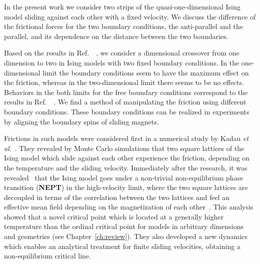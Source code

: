 In the present work we consider two strips of the quasi-one-dimensional Ising model sliding against each other with a fixed velocity. We discuss the difference of the frictional forces for the two boundary conditions, the anti-parallel and the parallel, and its dependence on the distance  between the two boundaries.

Based on the results in Ref.~~\cite{Hucht2009b}, we consider a dimensional crossover from one dimension to two in Ising models with two fixed boundary conditions. In the one-dimensional limit the boundary conditions seem to have the maximum effect on the friction, whereas in the two-dimensional limit there seems to be no effects. Behaviors in the both limits for the free boundary conditions correspond to the results in Ref.~~\cite{Hucht2009b}. We find a method of manipulating the friction using different boundary conditions. These boundary conditions can be realized in experiments  by aligning the boundary spins of sliding magnets.

Frictions in such models were considered first in a numerical study by Kadau \textit{et al}.~\cite{Kadau2008}. They revealed by Monte Carlo simulations that two square lattices of the Ising model which slide against each other experience the friction, depending on the temperature and the sliding velocity. Immediately after the research, it was revealed~\cite{Hucht2009b} that the Ising model goes under a non-trivial non-equilibrium phase transition (\textbf{NEPT}) in the high-velocity limit, where the two square lattices are decoupled in terms of the correlation between the two lattices and feel an effective mean field depending on the magnetization of each other~\cite{Hucht2009b}. This analysis showed that a novel critical point which is located at a generally higher temperature than the ordinal critical point for models in arbitrary dimensions and geometries (see Chapter~\ref{ch:review}). They also developed a new dynamics~\cite{Hucht2009b} which enables an analytical treatment for finite sliding velocities, obtaining a non-equilibrium critical line. 